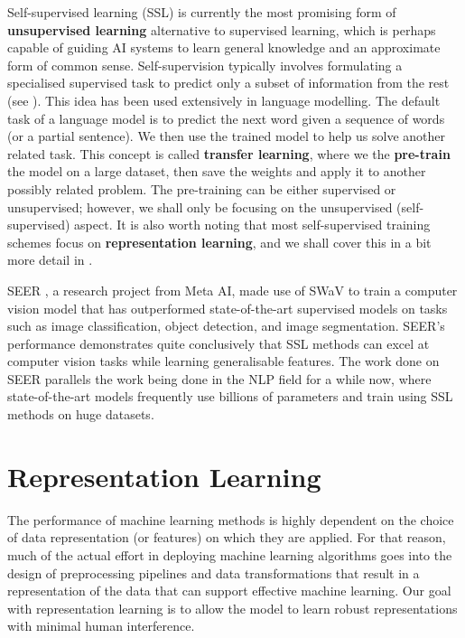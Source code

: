 Self-supervised learning (SSL) is currently the most promising form of \textbf{unsupervised learning} alternative to supervised learning, which is perhaps capable of guiding AI systems to learn general knowledge and an approximate form of common sense. Self-supervision typically involves formulating a specialised supervised task to predict only a subset of information from the rest (see ). This idea has been used extensively in language modelling. The default task of a language model is to predict the next word given a sequence of words (or a partial sentence). We then use the trained model to help us solve another related task. This concept is called \textbf{transfer learning}, where we the \textbf{pre-train} the model on a large dataset, then save the weights and apply it to another possibly related problem. The pre-training can be either supervised or unsupervised; however, we shall only be focusing on the unsupervised (self-supervised) aspect. It is also worth noting that most self-supervised training schemes focus on \textbf{representation learning}, and we shall cover this in a bit more detail in .

SEER \parencite{Goyal2021}, a research project from Meta AI, made use of SWaV \parencite{caron2020unsupervised} to train a computer vision model that has outperformed state-of-the-art supervised models on tasks such as image classification, object detection, and image segmentation. SEER's performance demonstrates quite conclusively that SSL methods can excel at computer vision tasks while learning generalisable features. The work done on SEER parallels the work being done in the NLP field for a while now, where state-of-the-art models frequently use billions of parameters and train using SSL methods on huge datasets.


\section{Representation Learning} \label{sec:repr-learning}
The performance of machine learning methods is highly dependent on the choice of data representation (or features) on which they are applied. For that reason, much of the actual effort in deploying machine learning algorithms goes into the design of preprocessing pipelines and data transformations that result in a representation of the data that can support effective machine learning. Our goal with representation learning is to allow the model to learn robust representations with minimal human interference.

